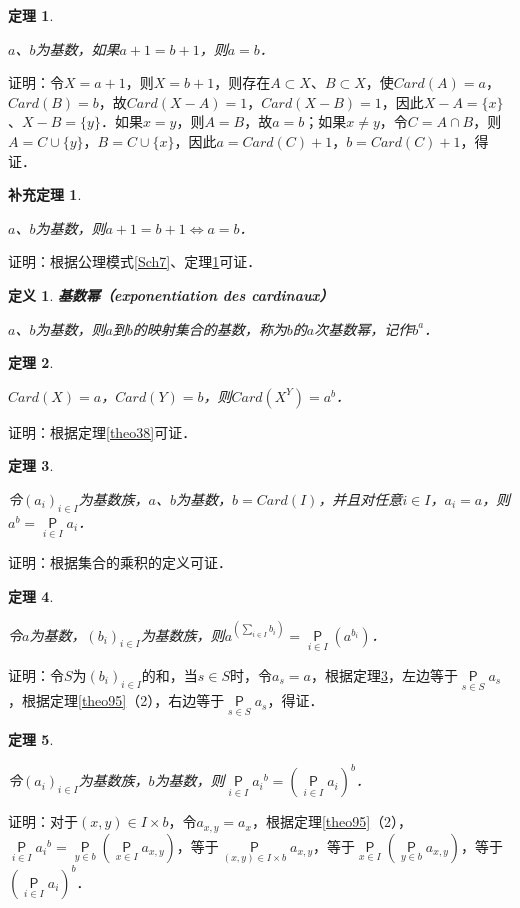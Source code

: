 \documentclass[12pt, a4paper, oneside]{book}
\newtheorem{theo}{定理}
\newtheorem{cor}{补充定理}
\newtheorem{de}{定义}
\begin{document}
			\begin{theo}\label{theo101}
				\hfill\par
				$a$、$b$为基数，如果$a+1=b+1$，则$a=b$．
			\end{theo}
			证明：令$X=a+1$，则$X=b+1$，则存在$A\subset X$、$B\subset X$，使$Card(A)=a$，$Card(B)=b$，故$Card(X-A)=1$，$Card(X-B)=1$，因此$X-A=\{x\}$、$X-B=\{y\}$．如果$x=y$，则$A=B$，故$a=b$；如果$x\neq y$，令$C=A\cap B$，则$A=C\cup \{y\}$，$B=C\cup\{x\}$，因此$a=Card(C)+1$，$b=Card(C)+1$，得证．
						
			\begin{cor}\label{cor297}
				\hfill\par
				$a$、$b$为基数，则$a+1=b+1\Leftrightarrow a=b$．
			\end{cor}
			证明：根据公理模式\ref{Sch7}、定理\ref{theo101}可证．
						
			\begin{de}
				\textbf{基数幂（exponentiation des cardinaux）}
				\par
				$a$、$b$为基数，则$a$到$b$的映射集合的基数，称为$b$的$a$次基数幂，记作$b^a$．
			\end{de}
			
			\begin{theo}\label{theo102}
				\hfill\par
				$Card(X)=a$，$Card(Y)=b$，则$Card(X^Y)=a^b$．
			\end{theo}
			证明：根据定理\ref{theo38}可证．
			
			\begin{theo}\label{theo103}
				\hfill\par
				令$(a_i)_{i\in I}$为基数族，$a$、$b$为基数，$b=Card(I)$，并且对任意$i\in I$，$a_i=a$，则$a^b=\mathop{\mathsf{P}}\limits_{i\in I}a_i$．
			\end{theo}
			证明：根据集合的乘积的定义可证．
						
			\begin{theo}\label{theo104}
				\hfill\par
				令$a$为基数，$(b_i)_{i\in I}$为基数族，则$a^{(\sum\limits_ {i\in I} b_i)}=\mathop{\mathsf{P}}\limits_{i\in I}(a^{b_i})$．
			\end{theo}
			证明：令$S$为$(b_i)_{i\in I}$的和，当$s\in S$时，令$a_s=a$，根据定理\ref{theo103}，左边等于$\mathop{\mathsf{P}}\limits_{s\in S}a_s$，根据定理\ref{theo95}（2），右边等于$\mathop{\mathsf{P}}\limits_{s\in S}a_s$，得证．
						
			\begin{theo}\label{theo105}
				\hfill\par
				令$(a_i)_{i\in I}$为基数族，$b$为基数，则$\mathop{\mathsf{P}}\limits_{i\in I}{a_i}^b=(\mathop{\mathsf{P}}\limits_{i\in I}a_i)^b$．
			\end{theo}
			证明：对于$(x, y)\in I\times b$，令$a_{x,y}=a_x$，根据定理\ref{theo95}（2），$\mathop{\mathsf{P}}\limits_{i\in I}{a_i}^b=\mathop{\mathsf{P}}\limits_{y\in b}(\mathop{\mathsf{P}}\limits_{x\in I}a_{x,y})$，等于$\mathop{\mathsf{P}}\limits_{(x, y)\in I\times b}a_{x,y}$，等于$\mathop{\mathsf{P}}\limits_{x\in I}(\mathop{\mathsf{P}}\limits_{y\in b}a_{x,y})$，等于$(\mathop{\mathsf{P}}\limits_{i\in I}a_i)^b$．
						
\end{document}
